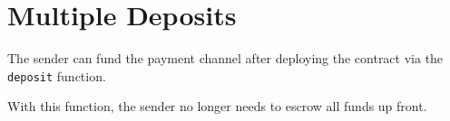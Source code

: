 \section{Multiple Deposits}\label{sec:multiple-deposits}
The sender can fund the payment channel after deploying the contract via the
\texttt{deposit} function.



With this function, the sender no longer needs to escrow all funds up front.